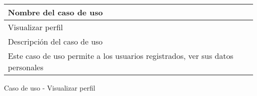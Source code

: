 \begin{identificacionCasoDeUso}
	\begin{tabular} { | p{17cm} | }
		\hline
		Nombre del caso de uso                                                        \\ \hline
		Visualizar perfil                                                             \\ \hline
		Descripción del caso de uso                                                   \\ \hline
		Este caso de uso permite a los usuarios registrados, ver sus datos personales \\ \hline
	\end{tabular}
	\caption{Caso de uso - Visualizar perfil}
\end{identificacionCasoDeUso}